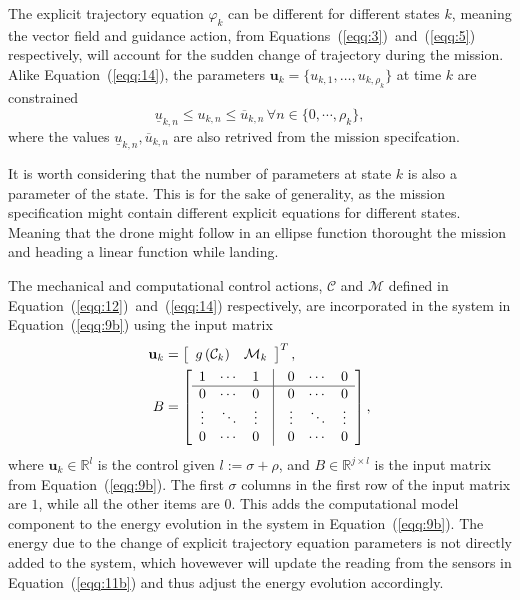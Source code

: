 \documentclass[letterpaper,10pt,conference]{ieeeconf}
\begin{document}
The explicit trajectory equation $\varphi_k$ can be different for different states $k$, meaning the vector field and guidance action, from Equations~(\ref{eqq:3})~and~(\ref{eqq:5}) respectively, will account for the sudden change of trajectory during the mission. Alike Equation~(\ref{eqq:14}), the parameters $\mathbf{u}_k=\{u_{k,1},\dots,u_{k,\rho_k}\}$ at time $k$ are constrained
\begin{equation}
  \underline{u}_{k,n}\leq u_{k,n}\leq \overline{u}_{k,n}\,\forall n\in\{0,\cdots,\rho_k\},
\end{equation}
where the values $\underline{u}_{k,n},\overline{u}_{k,n}$ are also retrived from the mission specifcation.

It is worth considering that the number of parameters at state $k$ is also a parameter of the state. This is for the sake of generality, as the mission specification might contain different explicit equations for different states. Meaning that the drone might follow in an ellipse function thorought the mission and heading a linear function while landing. 

The mechanical and computational control actions, $\mathcal{C}$ and $\mathcal{M}$ defined in Equation~(\ref{eqq:12})~and~(\ref{eqq:14}) respectively, are incorporated in the system in Equation~(\ref{eqq:9b}) using the input matrix
\begin{equation}\begin{split}
  \mathbf{u}_k&=\left[\begin{array}{cc}
    g\left(\mathcal{C}_k\right) & \mathcal{M}_k
  \end{array}\right]^T,\\
  B&=\left[\begin{array}{ccccccc}
    1 & \cdots & 1 & \vline & 0 & \cdots & 0\\\hline
    0 & \cdots & 0 & \vline & 0 & \cdots & 0\\
    \vdots & \ddots & \vdots & \vline & \vdots & \ddots & \vdots\\
    0 & \cdots & 0 & \vline & 0 & \cdots & 0
  \end{array}\right],
\end{split}
\end{equation}
where $\mathbf{u}_k\in\mathbb{R}^l$ is the control given $l:=\sigma+\rho$, and $B\in\mathbb{R}^{j\times l}$ is the input matrix from Equation~(\ref{eqq:9b}). The first $\sigma$ columns in the first row of the input matrix are $1$, while all the other items are $0$. This adds the computational model component to the energy evolution in the system in Equation~(\ref{eqq:9b}). The energy due to the change of explicit trajectory equation parameters is not directly added to the system, which hovewever will update the reading from the sensors in Equation~(\ref{eqq:11b}) and thus adjust the energy evolution accordingly.
\end{document}
